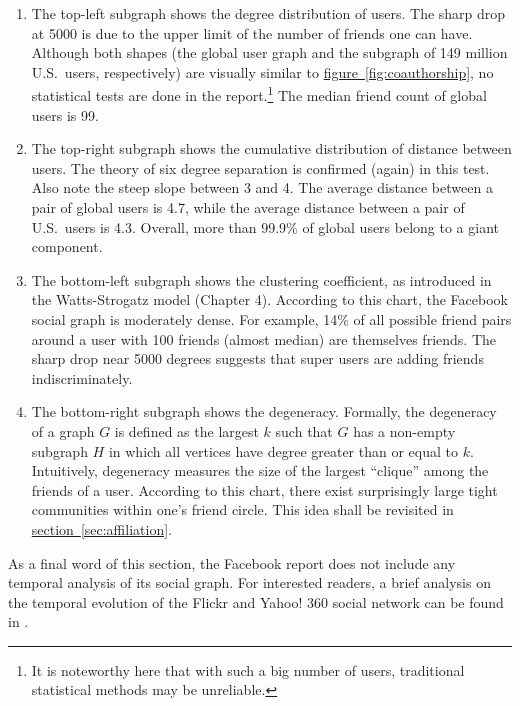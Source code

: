 \documentclass[11pt,a4paper]{article}
\begin{document}
\begin{enumerate}[topsep=0pt,itemsep=-1ex,partopsep=1ex,parsep=1ex]
\item The top-left subgraph shows the degree distribution of users. The sharp drop at 5000 is due to the upper limit of the number of friends one can have. Although both shapes (the global user graph and the subgraph of 149 million U.S.\ users, respectively) are visually similar to \hyperref[fig:coauthorship]{figure~\ref{fig:coauthorship}}, no statistical tests are done in the report.\footnote{It is noteworthy here that with such a big number of users, traditional statistical methods may be unreliable.} The median friend count of global users is 99.
\item The top-right subgraph shows the cumulative distribution of distance between users. The theory of six degree separation is confirmed (again) in this test. Also note the steep slope between 3 and 4. The average distance between a pair of global users is 4.7, while the average distance between a pair of U.S.\ users is 4.3. Overall, more than 99.9\% of global users belong to a giant component.
\item The bottom-left subgraph shows the clustering coefficient, as introduced in the Watts-Strogatz model (Chapter 4). According to this chart, the Facebook social graph is moderately dense. For example, 14\% of all possible friend pairs around a user with 100 friends (almost median) are themselves friends. The sharp drop near 5000 degrees suggests that super users are adding friends indiscriminately.
\item The bottom-right subgraph shows the degeneracy. Formally, the degeneracy of a graph $G$ is defined as the largest $k$ such that $G$ has a non-empty subgraph $H$ in which all vertices have degree greater than or equal to $k.$ Intuitively, degeneracy measures the size of the largest ``clique'' among the friends of a user. According to this chart, there exist surprisingly large tight communities within one's friend circle. This idea shall be revisited in \hyperref[sec:affiliation]{section~\ref{sec:affiliation}}.
\end{enumerate}

As a final word of this section, the Facebook report does not include any temporal analysis of its social graph. For interested readers, a brief analysis on the temporal evolution of the Flickr and Yahoo! 360 social network can be found in \cite{kumar2010structure}.
\end{document}
